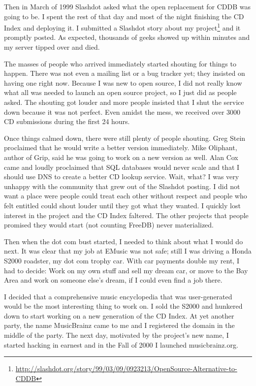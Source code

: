 Then in March of 1999 Slashdot asked what the open replacement for CDDB was
going to be. I spent the rest of that day and most of the night finishing the CD
Index and deploying it. I submitted a Slashdot story about my
project\footnote{\url{
http://slashdot.org/story/99/03/09/0923213/OpenSource-Alternative-to-CDDB}} and
it promptly posted. As expected, thousands of geeks showed up within minutes and
my server tipped over and died.

The masses of people who arrived immediately started shouting for things to
happen. There was not even a mailing list or a bug tracker yet; they insisted on
having one right now. Because I was new to open source, I did not really know
what all was needed to launch an open source project, so I just did as people
asked. The shouting got louder and more people insisted that I shut the service
down because it was not perfect. Even amidst the mess, we received over 3000 CD
submissions during the first 24 hours.

Once things calmed down, there were still plenty of people shouting. Greg Stein
proclaimed that he would write a better version immediately. Mike Oliphant,
author of Grip, said he was going to work on a new version as well. Alan Cox
came and loudly proclaimed that SQL databases would never scale and that I
should use DNS to create a better CD lookup service. Wait, what?
I was very unhappy with the community that grew out of the Slashdot posting. I
did not want a place were people could treat each other without respect and
people who felt entitled could shout louder until they got what they wanted. I
quickly lost interest in the project and the CD Index faltered. The other
projects that people promised they would start (not counting FreeDB) never
materialized.

Then when the dot com bust started, I needed to think about what I would do
next. It was clear that my job at EMusic was not safe; still I was driving a
Honda S2000 roadster, my dot com trophy car. With car payments double my rent, I
had to decide: Work on my own stuff and sell my dream car, or move to the Bay
Area and work on someone else’s dream, if I could even find a job there.

I decided that a comprehensive music encyclopedia that was user-generated would
be the most interesting thing to work on. I sold the S2000 and hunkered down to
start working on a new generation of the CD Index. At yet another party, the
name MusicBrainz came to me and I registered the domain in the middle of the
party. The next day, motivated by the project’s new name, I started hacking in
earnest and in the Fall of 2000 I launched musicbrainz.org.

